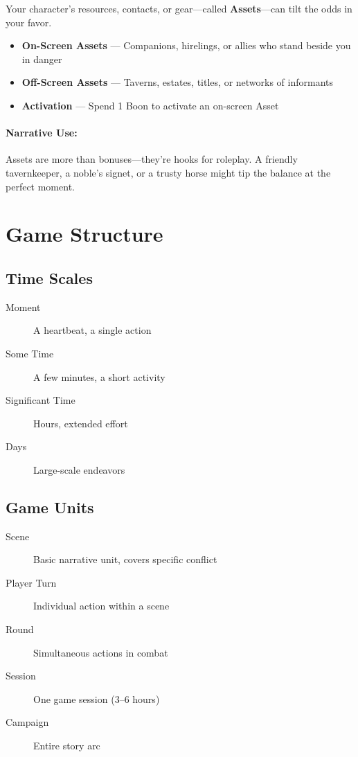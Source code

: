 Your character's resources, contacts, or gear—called \textbf{Assets}—can tilt the odds in your favor.

\begin{itemize}
  \item \textbf{On-Screen Assets} — Companions, hirelings, or allies who stand beside you in danger
  \item \textbf{Off-Screen Assets} — Taverns, estates, titles, or networks of informants
  \item \textbf{Activation} — Spend 1 Boon to activate an on-screen Asset
\end{itemize}

\paragraph{Narrative Use:}  
Assets are more than bonuses—they're hooks for roleplay. A friendly tavernkeeper, a noble's signet, or a trusty horse might tip the balance at the perfect moment.

\section{Game Structure} 

\subsection*{Time Scales}
\begin{description}
  \item[Moment] A heartbeat, a single action
  \item[Some Time] A few minutes, a short activity
  \item[Significant Time] Hours, extended effort
  \item[Days] Large-scale endeavors
\end{description}

\subsection*{Game Units}
\begin{description}
  \item[Scene] Basic narrative unit, covers specific conflict
  \item[Player Turn] Individual action within a scene
  \item[Round] Simultaneous actions in combat
  \item[Session] One game session (3--6 hours)
  \item[Campaign] Entire story arc
\end{description}

